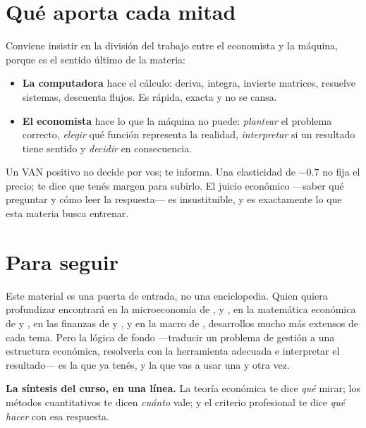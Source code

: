 \section{Qué aporta cada mitad}

Conviene insistir en la división del trabajo entre el economista y la máquina, porque es el sentido último de la materia:

\begin{itemize}
  \item \textbf{La computadora} hace el cálculo: deriva, integra, invierte matrices, resuelve sistemas, descuenta flujos. Es rápida, exacta y no se cansa.
  \item \textbf{El economista} hace lo que la máquina no puede: \emph{plantear} el problema correcto, \emph{elegir} qué función representa la realidad, \emph{interpretar} si un resultado tiene sentido y \emph{decidir} en consecuencia.
\end{itemize}

Un VAN positivo no decide por vos; te informa. Una elasticidad de $-0.7$ no fija el precio; te dice que tenés margen para subirlo. El juicio económico —saber qué preguntar y cómo leer la respuesta— es insustituible, y es exactamente lo que esta materia busca entrenar.

\section{Para seguir}

Este material es una puerta de entrada, no una enciclopedia. Quien quiera profundizar encontrará en la microeconomía de \cite{varian}, \cite{pindyck} y \cite{nicholson}, en la matemática económica de \cite{chiang} y \cite{sydsaeter}, en las finanzas de \cite{brealey} y \cite{sapag}, y en la macro de \cite{blanchard}, desarrollos mucho más extensos de cada tema. Pero la lógica de fondo —traducir un problema de gestión a una estructura económica, resolverla con la herramienta adecuada e interpretar el resultado— es la que ya tenés, y la que vas a usar una y otra vez.

\begin{ideabox}
\textbf{La síntesis del curso, en una línea.} La teoría económica te dice \emph{qué} mirar; los métodos cuantitativos te dicen \emph{cuánto} vale; y el criterio profesional te dice \emph{qué hacer} con esa respuesta.
\end{ideabox}
